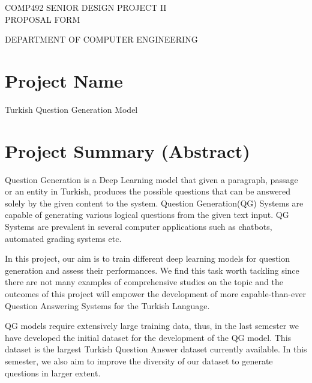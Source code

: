 \documentclass[10pt]{article}
\begin{document}
	

	
	\begin{spacing}{1.1}
	{\color{azure}
		\bfseries
		\huge{
			\noindent
			COMP492 SENIOR DESIGN PROJECT II \hspace{0pt} \\
			PROPOSAL FORM \par
		}
		\large{
			\noindent
			DEPARTMENT OF COMPUTER ENGINEERING \newline \par
		}
	}
	\end{spacing}
	\vspace{-2em}
	\section{Project Name}
	
	Turkish Question Generation Model
	

	\section{Project Summary (Abstract)}
	
	Question Generation is a Deep Learning model that given a paragraph, passage or an entity in Turkish, produces the possible questions that can be answered solely by the given content to the system. Question Generation(QG) Systems are capable of generating various logical questions from the given text input. QG Systems are prevalent in several computer applications such as chatbots, automated grading systems etc.\newline \par
	
	In this project, our aim is to train different deep learning models for question generation and assess their performances. We find this task worth tackling since there are not many examples of comprehensive studies on the topic and the outcomes of this project will empower the development of more capable-than-ever Question Answering Systems for the Turkish Language. \newline \par
	
	QG models require extensively large training data, thus, in the last semester we have developed the initial dataset for the development of the QG model. This dataset is the largest Turkish Question Answer dataset currently available. In this semester, we also aim to improve the diversity of our dataset to generate questions in larger extent. \newline \par
	
\end{document}
